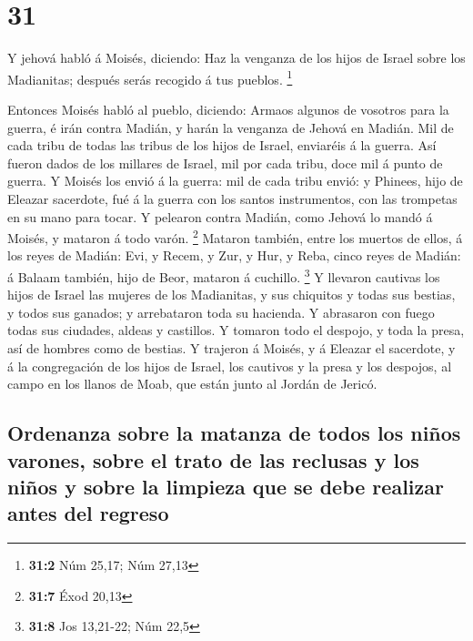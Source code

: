 \hypertarget{section-30}{%
\section{31}\label{section-30}}

 Y jehová habló á Moisés, diciendo:  Haz la
venganza de los hijos de Israel sobre los Madianitas; después serás
recogido á tus pueblos. \footnote{\textbf{31:2} Núm 25,17; Núm 27,13}

 Entonces Moisés habló al pueblo, diciendo: Armaos algunos
de vosotros para la guerra, é irán contra Madián, y harán la venganza de
Jehová en Madián.  Mil de cada tribu de todas las tribus de
los hijos de Israel, enviaréis á la guerra.  Así fueron
dados de los millares de Israel, mil por cada tribu, doce mil á punto de
guerra.  Y Moisés los envió á la guerra: mil de cada tribu
envió: y Phinees, hijo de Eleazar sacerdote, fué á la guerra con los
santos instrumentos, con las trompetas en su mano para tocar.
 Y pelearon contra Madián, como Jehová lo mandó á Moisés, y
mataron á todo varón. \footnote{\textbf{31:7} Éxod 20,13} 
Mataron también, entre los muertos de ellos, á los reyes de Madián: Evi,
y Recem, y Zur, y Hur, y Reba, cinco reyes de Madián: á Balaam también,
hijo de Beor, mataron á cuchillo. \footnote{\textbf{31:8} Jos 13,21-22;
  Núm 22,5}  Y llevaron cautivas los hijos de Israel las
mujeres de los Madianitas, y sus chiquitos y todas sus bestias, y todos
sus ganados; y arrebataron toda su hacienda.  Y abrasaron
con fuego todas sus ciudades, aldeas y castillos.  Y
tomaron todo el despojo, y toda la presa, así de hombres como de
bestias.  Y trajeron á Moisés, y á Eleazar el sacerdote, y
á la congregación de los hijos de Israel, los cautivos y la presa y los
despojos, al campo en los llanos de Moab, que están junto al Jordán de
Jericó.

\hypertarget{ordenanza-sobre-la-matanza-de-todos-los-niuxf1os-varones-sobre-el-trato-de-las-reclusas-y-los-niuxf1os-y-sobre-la-limpieza-que-se-debe-realizar-antes-del-regreso}{%
\subsection{Ordenanza sobre la matanza de todos los niños varones, sobre
el trato de las reclusas y los niños y sobre la limpieza que se debe
realizar antes del
regreso}\label{ordenanza-sobre-la-matanza-de-todos-los-niuxf1os-varones-sobre-el-trato-de-las-reclusas-y-los-niuxf1os-y-sobre-la-limpieza-que-se-debe-realizar-antes-del-regreso}}

